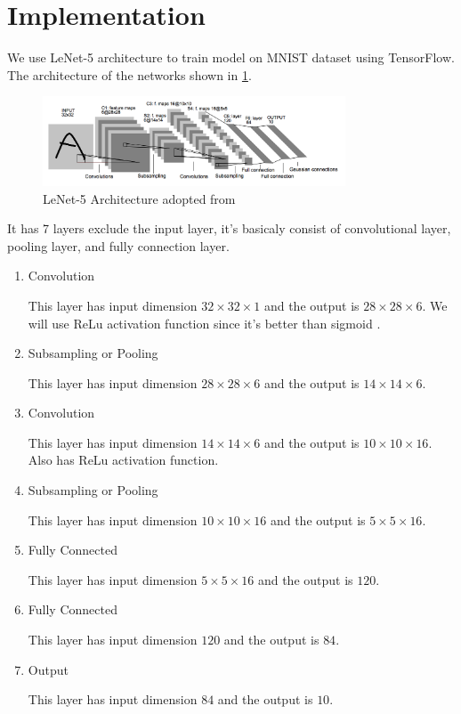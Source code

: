 \documentclass[conference]{IEEEtran}
\begin{document}
\section{Implementation}
We use LeNet-5 architecture to train model on MNIST dataset using TensorFlow. The architecture of the networks shown in \ref{fig:lenet-5archi}.
\begin{figure}[htbp]
    \centerline{\includegraphics[width=9cm]{LeNet-5Architecture.png}}
    \caption{LeNet-5 Architecture adopted from \protect\cite{lenet-5} }
    \label{fig:lenet-5archi}
\end{figure}
It has 7 layers exclude the input layer, it's basicaly consist of convolutional layer, pooling layer, and fully connection layer.
\begin{enumerate}
    \item Convolution

    This layer has input dimension $32 \times 32 \times 1$ and the output is $28 \times 28 \times 6$.
    We will use ReLu activation function since it's better than sigmoid \cite{wang2020improvement}.

    \item Subsampling or Pooling 
    
    This layer has input dimension $28 \times 28 \times 6$ and the output is $14 \times 14 \times 6$.

    \item Convolution
    
    This layer has input dimension $14 \times 14 \times 6$ and the output is $10 \times 10 \times 16$. Also has ReLu activation function.

    \item Subsampling or Pooling 
    
    This layer has input dimension $10 \times 10 \times 16$ and the output is $5 \times 5 \times 16$.

    \item Fully Connected
    
    This layer has input dimension $5 \times 5 \times 16$ and the output is $120$.

    \item Fully Connected
    
    This layer has input dimension $120$ and the output is $84$.

    \item Output  
    
    This layer has input dimension $84$ and the output is $10$.

\end{enumerate}
\end{document}
